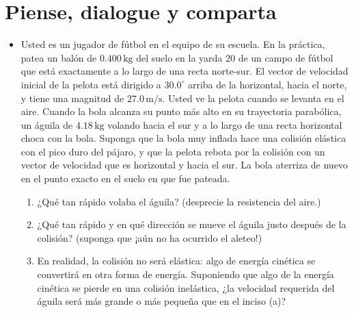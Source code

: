 \documentclass[11pt,a4paper]{article}
\begin{document}
\section*{Piense, dialogue y comparta}

\begin{itemize}
    \item[\textbf{1.}] Usted es un jugador de fútbol en el equipo de su escuela. En la práctica, patea un balón de \(0.400\,\text{kg}\) del suelo en la yarda 20 de un campo de fútbol que está exactamente a lo largo de una recta norte-sur. El vector de velocidad inicial de la pelota está dirigido a \(30.0^\circ\) arriba de la horizontal, hacia el norte, y tiene una magnitud de \(27.0\,\text{m/s}\). Usted ve la pelota cuando se levanta en el aire. Cuando la bola alcanza su punto más alto en su trayectoria parabólica, un águila de \(4.18\,\text{kg}\) volando hacia el sur y a lo largo de una recta horizontal choca con la bola. Suponga que la bola muy inflada hace una colisión elástica con el pico duro del pájaro, y que la pelota rebota por la colisión con un vector de velocidad que es horizontal y hacia el sur. La bola aterriza de nuevo en el punto exacto en el suelo en que fue pateada.
    \begin{enumerate}
        \item ¿Qué tan rápido volaba el águila? (desprecie la resistencia del aire.)
        \item ¿Qué tan rápido y en qué dirección se mueve el águila justo después de la colisión? (suponga que ¡aún no ha ocurrido el aleteo!)
        \item En realidad, la colisión no será elástica: algo de energía cinética se convertirá en otra forma de energía. Suponiendo que algo de la energía cinética se pierde en una colisión inelástica, ¿la velocidad requerida del águila será más grande o más pequeña que en el inciso (a)?
    \end{enumerate}
    \vspace*{9cm}


\end{itemize}
\end{document}
